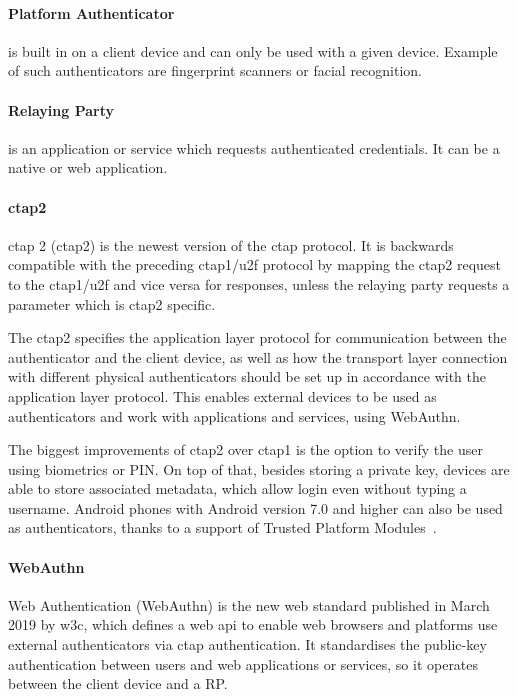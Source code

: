 \paragraph{Platform Authenticator} 
is built in on a client device and can only be used with a given device. Example of such authenticators are fingerprint scanners or facial recognition.

\paragraph{Relaying Party} 
is an application or service which requests authenticated credentials. It can be a native or web application.

\paragraph{\acrshort{ctap}2}
\acrlong{ctap} 2 (\acrshort{ctap}2) is the newest version of the \acrshort{ctap} protocol. It is backwards compatible with the preceding \acrshort{ctap}1/\acrshort{u2f} protocol by mapping the \acrshort{ctap}2 request to the \acrshort{ctap}1/\acrshort{u2f} and vice versa for responses, unless the relaying party requests a parameter which is \acrshort{ctap}2 specific. 

The \acrshort{ctap}2 specifies the application layer protocol for communication between the authenticator and the client device, as well as how the transport layer connection with different physical authenticators should be set up in accordance with the application layer protocol. This enables external devices to be used as authenticators and work with applications and services, using WebAuthn.

The biggest improvements of \acrshort{ctap}2 over \acrshort{ctap}1 is the option to verify the user using biometrics or PIN. On top of that, besides storing a private key, devices are able to store associated metadata, which allow login even without typing a username. Android phones with Android version 7.0 and higher can also be used as authenticators, thanks to a support of Trusted Platform Modules~\cite{FIDOAlliance2019News:Key}.

\paragraph{WebAuthn} 
Web Authentication (WebAuthn) is the new web standard published in March 2019  by \acrshort{w3c}, which defines a web \acrshort{api} to enable web browsers and platforms use external authenticators via \acrshort{ctap} authentication. It standardises the public-key authentication between users and web applications or services, so it operates between the client device and a RP.


